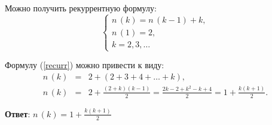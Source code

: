 \documentclass{article}
\begin{document}
\begin{enumerate}
        Можно получить рекуррентную формулу:
        \begin{equation}\label{recurr}
            \begin{cases}
                n\,(k) = n\,(k-1)+k, \\
                n\,(1) = 2, \\
                k = 2, 3, \ldots
            \end{cases}
        \end{equation}

        Формулу (\ref{recurr}) можно привести к виду:
        \begin{eqnarray}
            n\,(k) &=& 2 + (2 + 3 + 4 + \ldots + k), \\
            n\,(k) &=& 2 + \frac{(2 + k)(k - 1)}{2} = \frac{2k-2+k^2-k+4}{2}=1+\frac{k(k+1)}{2}.
        \end{eqnarray}

        \textbf{Ответ}:
        $n\,(k) = 1 + \frac{k(k+1)}{2}$

    \end{enumerate}
\end{document}
